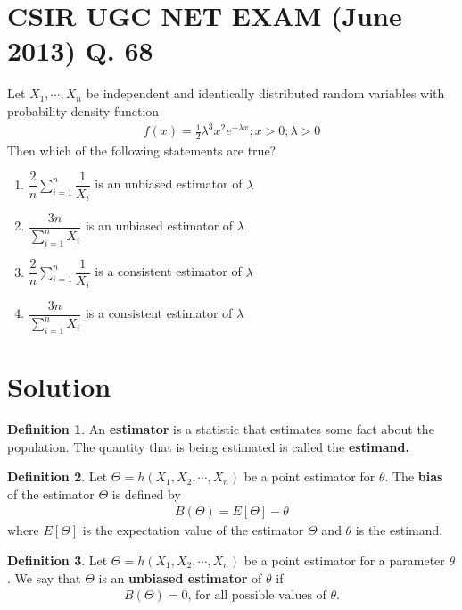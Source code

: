 \documentclass[journal,12pt,twocolumn]{IEEEtran}
\theoremstyle{definition}
\newtheorem{definition}{Definition}[section]
\begin{document}
\section*{CSIR UGC NET EXAM (June 2013) Q. 68}
Let $ X_1, \cdots , X_n $ be independent and identically distributed random variables with probability density function
\begin{align}
    f(x) = \frac{1}{2} \lambda^3x^2e^{-\lambda x} ; x>0 ; \lambda > 0
    \label{pdf}
\end{align}
Then which of the following statements are true?
\begin{enumerate}
    \item $\dfrac{2}{n} \sum_{i=1}^{n} \dfrac{1}{X_i} $ is an unbiased estimator of $ \lambda$
    \item $\dfrac{3n}{\sum_{i=1}^{n} X_i } $ is an unbiased estimator of $ \lambda$ \\
    \item $\dfrac{2}{n} \sum_{i=1}^{n} \dfrac{1}{X_i} $ is a consistent estimator of $ \lambda$
    \item $\dfrac{3n}{\sum_{i=1}^{n} X_i } $ is a consistent estimator of $ \lambda$
\end{enumerate}

\section*{Solution}
\begin{definition}
An \textbf{estimator} is a statistic that estimates some fact about the population.
The quantity that is being estimated is called the \textbf{estimand.} 
\end{definition}
\begin{definition}
Let $ \Theta = h(X_1,X_2, \cdots, X_n) $  be a point estimator for $ \theta$. The \textbf{bias} of the estimator $ \Theta $ is defined by 
\begin{align}
    B(\Theta ) = E[\Theta ] - \theta
\end{align}
where $ E[\Theta ]$ is the expectation value of the estimator $ \Theta $ and $ \theta$ is the estimand.
\end{definition}

    \begin{definition}
    Let $\Theta = h(X_1,X_2, \cdots , X_n) $ be a point estimator for a parameter $ \theta $. We say that $ \Theta $ is an \textbf{unbiased estimator} of $ \theta $ if
    \begin{align}
       B(\Theta )= 0 \text{, for all possible values of $\theta$.}
    \end{align}
    \end{definition} 
\end{document}
